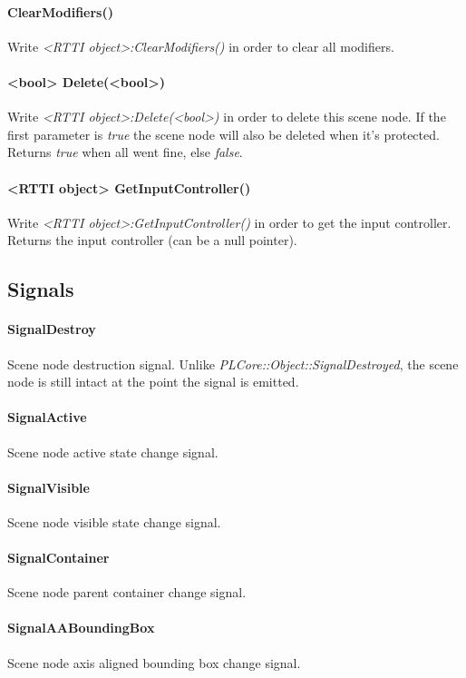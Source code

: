 \paragraph{ClearModifiers()}
Write \emph{<RTTI object>:ClearModifiers()} in order to clear all modifiers.

\paragraph{<bool> Delete(<bool>)}
Write \emph{<RTTI object>:Delete(<bool>)} in order to delete this scene node. If the first parameter is \emph{true} the scene node will also be deleted when it's protected. Returns \emph{true} when all went fine, else \emph{false}.

\paragraph{<RTTI object> GetInputController()}
Write \emph{<RTTI object>:GetInputController()} in order to get the input controller. Returns the input controller (can be a null pointer).


\subsection{Signals}

\paragraph{SignalDestroy}
Scene node destruction signal. Unlike \emph{PLCore::Object::SignalDestroyed}, the scene node is still intact at the point the signal is emitted.

\paragraph{SignalActive}
Scene node active state change signal.

\paragraph{SignalVisible}
Scene node visible state change signal.

\paragraph{SignalContainer}
Scene node parent container change signal.

\paragraph{SignalAABoundingBox}
Scene node axis aligned bounding box change signal.

